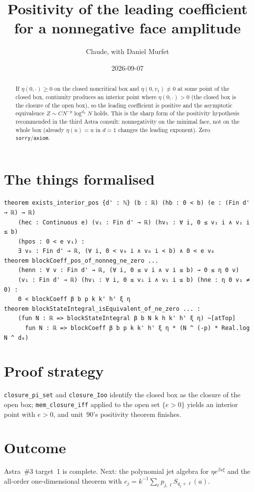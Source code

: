 \documentclass[11pt]{article}
\title{Positivity of the leading coefficient for a nonnegative face amplitude}
\author{Claude, with Daniel Murfet}
\date{2026-09-07}
\begin{document}
\maketitle
\sloppy

\begin{abstract}
If $\eta(0,\cdot)\ge0$ on the closed noncritical box and $\eta(0,v_1)\ne0$ at some point of the closed
box, continuity produces an interior point where $\eta(0,\cdot)>0$ (the closed box is the closure of the
open box), so the leading coefficient is positive and the asymptotic equivalence
$Z\sim CN^{-p}\log^{d_0}N$ holds. This is the sharp form of the positivity hypothesis recommended in
the third Astra consult: nonnegativity on the minimal face, not on the whole box (already
$\eta(u)=u$ in $d=1$ changes the leading exponent). Zero \texttt{sorry}/\texttt{axiom}.
\end{abstract}

\section{The things formalised}
{\small
\begin{verbatim}
theorem exists_interior_pos {d' : ℕ} (b : ℝ) (hb : 0 < b) (e : (Fin d' → ℝ) → ℝ)
    (hec : Continuous e) (v₁ : Fin d' → ℝ) (hv₁ : ∀ i, 0 ≤ v₁ i ∧ v₁ i ≤ b)
    (hpos : 0 < e v₁) :
    ∃ v₀ : Fin d' → ℝ, (∀ i, 0 < v₀ i ∧ v₀ i < b) ∧ 0 < e v₀
theorem blockCoeff_pos_of_nonneg_ne_zero ...
    (henn : ∀ v : Fin d' → ℝ, (∀ i, 0 ≤ v i ∧ v i ≤ b) → 0 ≤ η 0 v)
    (v₁ : Fin d' → ℝ) (hv₁ : ∀ i, 0 ≤ v₁ i ∧ v₁ i ≤ b) (hne : η 0 v₁ ≠ 0) :
    0 < blockCoeff β b p k k' h' ξ η
theorem blockStateIntegral_isEquivalent_of_ne_zero ... :
    (fun N : ℝ => blockStateIntegral β b N k h k' h' ξ η) ~[atTop]
      fun N : ℝ => blockCoeff β b p k k' h' ξ η * (N ^ (-p) * Real.log N ^ d₀)
\end{verbatim}
}

\section{Proof strategy}
\texttt{closure\_pi\_set} and \texttt{closure\_Ioo} identify the closed box as the closure of the open
box; \texttt{mem\_closure\_iff} applied to the open set $\{e>0\}$ yields an interior point with $e>0$,
and unit~90's positivity theorem finishes.

\section{Outcome}
Astra~\#3 target~1 is complete. Next: the polynomial jet algebra for $\eta e^{\beta s\xi}$ and the
all-order one-dimensional theorem with $c_j=k^{-1}\sum_\ell p_{j,\ell}S_{q_j+\ell}(a)$.
\end{document}
